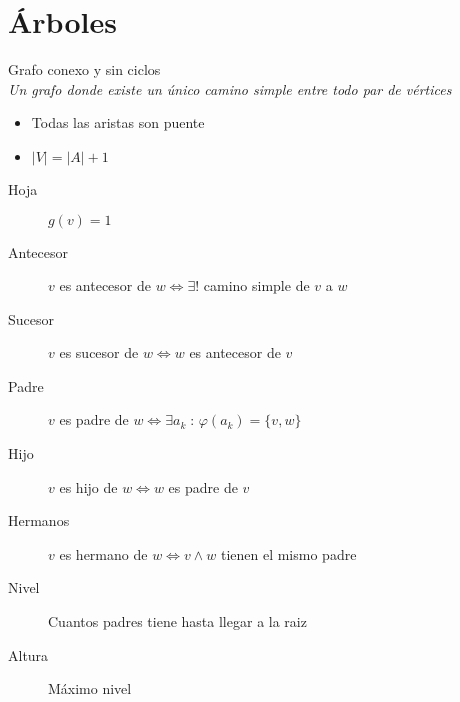 \documentclass[a4paper]{article}
\numberwithin{equation}{section}
\numberwithin{figure}{section}
\numberwithin{table}{section}
\newcommand{\refa}[1]{}
\newcommand{\talque}{\;:\,} %
\begin{document}
\section{\'Arboles}
Grafo conexo y sin ciclos\\
\emph{Un grafo donde existe un \'unico camino simple entre todo par de v\'ertices}
\begin{itemize}
	\item Todas las aristas son puente\refa{puente}
    \item $|V| = |A| +1$
\end{itemize}
\begin{description}
	\item[Hoja] $g(v) = 1$
    \item[Antecesor] $v$ es antecesor de $w \iff \exists ! $ camino simple\refa{camino simple} de $v$ a $w$
    \item[Sucesor] $v$ es sucesor de $w \iff w$ es antecesor de $v$
    \item[Padre] $v$ es padre de $w \iff \exists a_k \talque \varphi(a_k) = \{v, w\}$
    \item[Hijo] $v$ es hijo de $w \iff w$ es padre de $v$
    \item[Hermanos] $v$ es hermano de $w \iff v \land w$ tienen el mismo padre
    \item[Nivel] Cuantos padres tiene hasta llegar a la raiz
    \item[Altura] M\'aximo nivel
\end{description}
\end{document}
